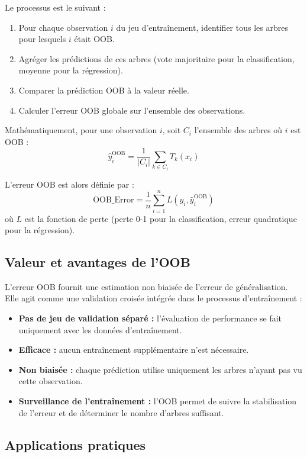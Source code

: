 Le processus est le suivant :
\begin{enumerate}
    \item Pour chaque observation $i$ du jeu d’entraînement, identifier tous les arbres pour lesquels $i$ était OOB.
    \item Agréger les prédictions de ces arbres (vote majoritaire pour la classification, moyenne pour la régression).
    \item Comparer la prédiction OOB à la valeur réelle.
    \item Calculer l’erreur OOB globale sur l’ensemble des observations.
\end{enumerate}

Mathématiquement, pour une observation $i$, soit $C_i$ l’ensemble des arbres où $i$ est OOB :
\[
\hat{y}^{\text{OOB}}_i = \frac{1}{|C_i|} \sum_{k \in C_i} T_k(x_i)
\]

L’erreur OOB est alors définie par :
\[
\text{OOB\_Error} = \frac{1}{n} \sum_{i=1}^{n} L(y_i, \hat{y}^{\text{OOB}}_i)
\]
où $L$ est la fonction de perte (perte 0-1 pour la classification, erreur quadratique pour la régression).

\subsection{Valeur et avantages de l’OOB}

L’erreur OOB fournit une estimation non biaisée de l’erreur de généralisation. Elle agit comme une validation croisée intégrée dans le processus d’entraînement :

\begin{itemize}
    \item \textbf{Pas de jeu de validation séparé :} l’évaluation de performance se fait uniquement avec les données d’entraînement.
    \item \textbf{Efficace :} aucun entraînement supplémentaire n’est nécessaire.
    \item \textbf{Non biaisée :} chaque prédiction utilise uniquement les arbres n’ayant pas vu cette observation.
    \item \textbf{Surveillance de l’entraînement :} l’OOB permet de suivre la stabilisation de l’erreur et de déterminer le nombre d’arbres suffisant.
\end{itemize}

\subsection{Applications pratiques}


